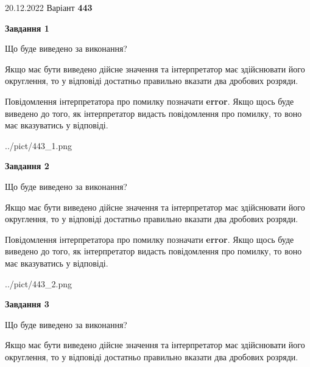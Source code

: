 \documentclass[12pt, ukrainian]{article}
\begin{document}
{20.12.2022 Варіант \No \textbf { 443 }\par}
{
\begin {Large}

{\begin {center}\textbf{Завдання 1}\end {center}}\par
Що буде виведено за виконання? \par

Якщо має бути виведено дійсне значення та інтерпретатор має здійснювати його округлення, 
то у відповіді достатньо правильно вказати два дробових розряди.

Повідомлення інтерпретатора про помилку позначати \textbf{error}.
Якщо щось буде виведено до того, як інтерпретатор видасть повідомлення про помилку, 
то воно має вказуватись у відповіді. \par

\begin{center}
	{../pict/443_1.png}
\end{center}
\newpage

{\begin {center}\textbf{Завдання 2}\end {center}}\par
Що буде виведено за виконання? \par

Якщо має бути виведено дійсне значення та інтерпретатор має здійснювати його округлення, 
то у відповіді достатньо правильно вказати два дробових розряди.

Повідомлення інтерпретатора про помилку позначати \textbf{error}.
Якщо щось буде виведено до того, як інтерпретатор видасть повідомлення про помилку, 
то воно має вказуватись у відповіді. \par

\begin{center}
	{../pict/443_2.png}
\end{center}
\newpage

{\begin {center}\textbf{Завдання 3}\end {center}}\par
Що буде виведено за виконання? \par

Якщо має бути виведено дійсне значення та інтерпретатор має здійснювати його округлення, 
то у відповіді достатньо правильно вказати два дробових розряди.


\end{Large}}
\end{document}
